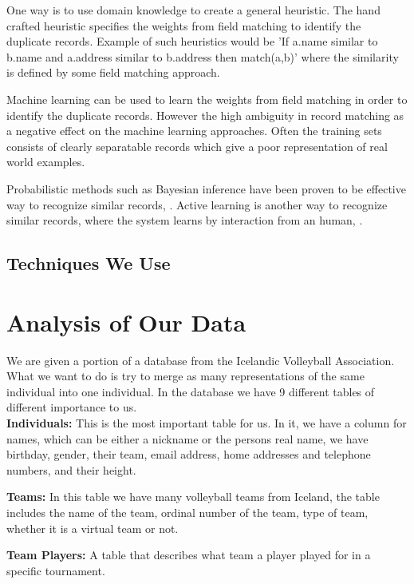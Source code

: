 \documentclass[tog]{acmsiggraph}
\begin{document}
One way is to use domain knowledge to create a general heuristic. The hand crafted heuristic specifies the weights from field matching to identify the duplicate records. Example of such heuristics would be 'If a.name similar to b.name and a.address similar to b.address then match(a,b)' where the similarity is defined by some field matching approach.

Machine learning can be used to learn the weights from field matching in order to identify the duplicate records. However the high ambiguity in record matching as a negative effect on the machine learning approaches. Often the training sets consists of clearly separatable records which give a poor representation of real world examples.

Probabilistic methods such as Bayesian inference have been proven to be effective way to recognize similar records, \textcite{newcombe1959automatic}. Active learning is another way to recognize similar records, where the system learns by interaction from an human, \textcite{sarawagi2002interactive}.

\subsection{Techniques We Use}




\section{Analysis of Our Data}
We are given a portion of a database from the Icelandic Volleyball Association. What we want to do is try to merge as many representations of the same individual into one individual. In the database we have 9 different tables of different importance to us.\\

\textbf{Individuals:} This is the most important table for us. In it, we have a column for names, which can be either a nickname or the persons real name, we have birthday, gender, their team, email address, home addresses and telephone numbers, and their height. 

\textbf{Teams:} In this table we have many volleyball teams from Iceland, the table includes the name of the team, ordinal number of the team, type of team, whether it is a virtual team or not. 

\textbf{Team Players:} A table that describes what team a player played for in a specific tournament. 
\end{document}
